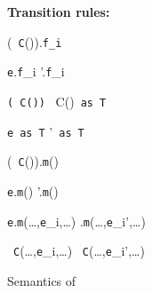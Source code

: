 \begin{figure*}
{\bf Transition rules:}\\[-12pt]


	{(\new\ {\tt C}()).{\tt f_i} }

	{{\tt e}.{\tt f}_i '.{\tt f}_i}

	{{\tt (\new\ C())} \derives \new\ C()~{\tt as}~{\tt T}}

	{{\tt e}~{\tt as}~{\tt T} '~{\tt as}~{\tt T}}

		{(\new\ {\tt C}()).{\tt m}()
                }

		{{\tt e}.{\tt m}() '.{\tt m}()}

		{{\tt e}.{\tt m}(\ldots,{\tt e}_i,\ldots) .{\tt m}(\ldots,{\tt e}_i',\ldots)} 

		{\new\ {\tt C}(\ldots,{\tt e}_i,\ldots) \derives \new\ {\tt C}(\ldots,{\tt e}_i',\ldots)}

 \caption{Semantics of \FX}\label{fig:FX}
\end{figure*}
